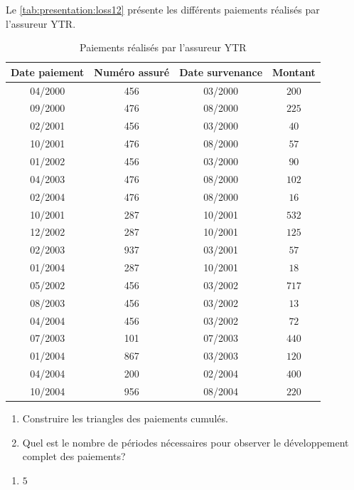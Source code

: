\begin{exercice}
 Le \autoref{tab:presentation:loss12} présente les différents paiements
 réalisés par l'assureur YTR.
  \begin{table}[!h]
    \centering
    \caption{Paiements réalisés par l'assureur YTR}
    \label{tab:presentation:loss12}
    \begin{tabular}{cccc}
      \toprule
      Date paiement & Numéro assuré & Date survenance & Montant\\
      \midrule
      04/2000 & 456 & 03/2000 & $200$\\
      09/2000 & 476 & 08/2000 & $225$\\
      02/2001 & 456 & 03/2000 & $40$\\
      10/2001 & 476 & 08/2000 & $57$\\
      01/2002 & 456 & 03/2000 & $90$\\
      04/2003 & 476 & 08/2000 & $102$\\
      02/2004 & 476 & 08/2000 & $16$\\
      10/2001 & 287 & 10/2001 & $532$\\
      12/2002 & 287 & 10/2001 & $125$\\
      02/2003 & 937 & 03/2001 & $57$\\
      01/2004 & 287 & 10/2001 & $18$\\
      05/2002 & 456 & 03/2002 & $717$\\
      08/2003 & 456 & 03/2002 & $13$\\
      04/2004 & 456 & 03/2002 & $72$\\
      07/2003 & 101 & 07/2003 & $440$\\
      01/2004 & 867 & 03/2003 & $120$\\
      04/2004 & 200 & 02/2004 & $400$\\
      10/2004 & 956 & 08/2004 & $220$\\
      \bottomrule
    \end{tabular}
  \end{table}
  \begin{enumerate}
  \item Construire les triangles des paiements cumulés.
  \item Quel est le nombre de périodes nécessaires pour observer le
    développement complet des paiements?
  \end{enumerate}
  \begin{rep}
    \begin{enumerate}
    \item $5$

\end{enumerate}
\end{rep}
\end{exercice}
